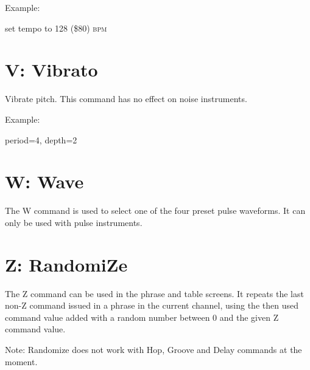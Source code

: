 \begin{description}
\item Example:
\item[T80] set tempo to 128 (\$80) \textsc{bpm}
\end{description}

\section{V: Vibrato}

Vibrate pitch. This command has no effect on noise instruments.

\begin{description}
\item Example:
\item[V42] period=4, depth=2
\end{description}

\section{W: Wave}

The W command is used to select one of the four preset pulse waveforms. It can only be used with pulse instruments.

\section{Z: RandomiZe}

The Z command can be used in the phrase and table screens. It repeats the last non-Z command issued in a phrase in the current channel, using the then used command value added with a random number between 0 and the given Z command value.

Note: Randomize does not work with Hop, Groove and Delay commands at the moment.
